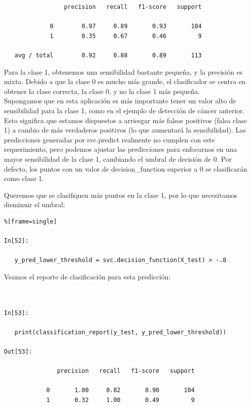 {\begin{lstlisting}
                 precision   recall   f1-score   support
                
             0        0.97     0.89       0.93       104
             1        0.35     0.67       0.46         9
       
   avg / total        0.92     0.88       0.89       113

\end{lstlisting}

Para la clase 1, obtenemos una sensibilidad  bastante pequeña, y la precisión es mixta. Debido
 a que la clase 0 es mucho más grande, el clasificador se centra en obtener la clase correcta, la 
  clase 0,  y no la clase 1 más pequeña. \\
  
Supongamos que en esta aplicación es más importante tener un valor alto de sensibilidad para la clase 1, como en el ejemplo de detección de cáncer anterior.     
  Esto significa que estamos dispuestos a arriesgar más falsos positivos (falsa clase 1) a cambio de más verdaderos positivos (lo que aumentará la sensibilidad). Las predicciones generadas por {\ttfamily svc.predict} realmente no cumplen con este requerimiento, pero podemos ajustar las predicciones para enfocarnos en una mayor sensibilidad de la clase 1, cambiando el umbral de decisión de 0. Por defecto, los puntos con un valor de {\ttfamily decision\_function}    superior a 0 se clasificarán como clase 1. 
  
  Queremos que se clasifiquen más puntos en la clase 1, por lo que necesitamos disminuir el umbral:


\begin{lstlisting}%[frame=single]

In[52]:

   y_pred_lower_threshold = svc.decision_function(X_test) > -.8

\end{lstlisting}

Veamos el reporte  de clasificación para esta predicción:


\begin{lstlisting}


In[53]:

   print(classification_report(y_test, y_pred_lower_threshold))

Out[53]:

               precision   recall   f1-score   support
               
            0       1.00     0.82       0.90       104
            1       0.32     1.00       0.49         9
            

\end{lstlisting}}
